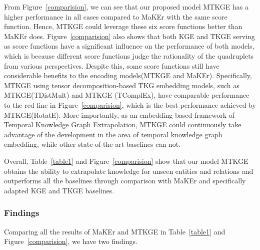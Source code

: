 \documentclass[sigconf]{acmart}
\begin{document}
\par
From Figure~\ref{comparision}, we can see that our proposed model MTKGE has a higher performance in all cases compared to MaKEr with the same score function. Hence, MTKGE could leverage these six score functions better than MaKEr does. 
Figure~\ref{comparision} also shows that both KGE and TKGE serving as score functions have a significant influence on the performance of both models, which is because different score functions judge the rationality of the quadruplets from various perspectives. 
Despite this, some score functions still have considerable benefits to the encoding models(MTKGE and MaKEr). Specifically, MTKGE using
tensor decomposition-based TKG embedding models, 
such as MTKGE(TDistMult) and MTKGE (TComplEx), have comparable performance to the red line in Figure~\ref{comparision}, which is the best performance achieved by MTKGE(RotatE).
More importantly, as an embedding-based framework of Temporal Knowledge Graph Extrapolation, MTKGE could continuously take advantage of the development in the area of temporal knowledge graph embedding, while other state-of-the-art baselines can not. 
\par
Overall, Table~\ref{table1} and Figure~\ref{comparision} show that our model MTKGE obtains the ability to extrapolate knowledge for unseen entities and relations and outperforms all the baselines through comparison with MaKEr and specifically adapted KGE and TKGE baselines. 

\subsubsection{\textbf{Findings}}
Comparing all the results of MaKEr and MTKGE in Table~\ref{table1} and Figure~\ref{comparision}, we have two findings.\\
\end{document}
